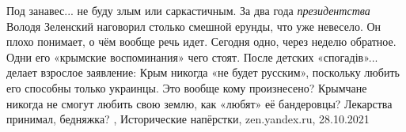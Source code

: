 Под занавес...  не буду злым или саркастичным. За два года \emph{президентства} Володя
Зеленский наговорил столько смешной ерунды, что уже невесело. Он плохо
понимает, о чём вообще речь идет. Сегодня одно, через неделю обратное. Одни его
«крымские воспоминания» чего стоят.  После детских «спогадів»... делает
взрослое заявление: Крым никогда «не будет русским», поскольку любить его
способны только украинцы. Это вообще кому произнесено? Крымчане никогда не
смогут любить свою землю, как «любят» её бандеровцы? Лекарства принимал,
бедняжка?
, 
Исторические напёрстки, zen.yandex.ru, 28.10.2021
